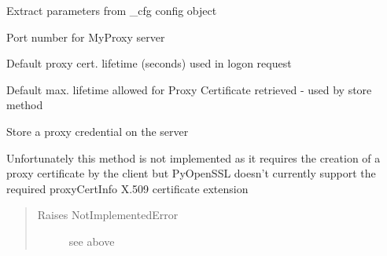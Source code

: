 \documentclass[letterpaper,10pt,english]{sphinxmanual}
\begin{document}
\begin{fulllineitems}
\begin{fulllineitems}
\label{client:myproxy.client.MyProxyClient.parseConfig}
Extract parameters from \_cfg config object

\end{fulllineitems}


\begin{fulllineitems}
\label{client:myproxy.client.MyProxyClient.port}
Port number for MyProxy server

\end{fulllineitems}


\begin{fulllineitems}
\label{client:myproxy.client.MyProxyClient.proxyCertLifetime}
Default proxy cert. lifetime (seconds) used in logon request

\end{fulllineitems}


\begin{fulllineitems}
\label{client:myproxy.client.MyProxyClient.proxyCertMaxLifetime}
Default max. lifetime allowed for Proxy Certificate retrieved - used by store method

\end{fulllineitems}


\begin{fulllineitems}
\label{client:myproxy.client.MyProxyClient.put}
Store a proxy credential on the server

Unfortunately this method is not implemented as it requires the creation
of a proxy certificate by the client but PyOpenSSL doesn't currently 
support the required proxyCertInfo X.509 certificate extension
\begin{quote}\begin{description}
\item[{Raises NotImplementedError}] \leavevmode
see above


\end{description}
\end{quote}
\end{fulllineitems}
\end{fulllineitems}
\end{document}
